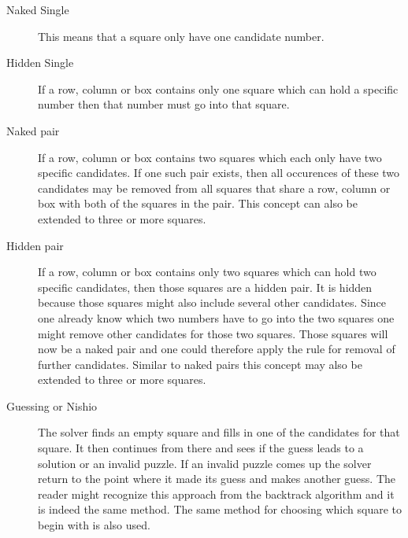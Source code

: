 \documentclass[a4paper,11pt]{kth-mag}
\begin{document}
\begin{description}
    \item[Naked Single] 
    This means that a square only have one candidate number.
    \item[Hidden Single] 
    If a row, column or box contains only one square which can hold a specific number then that number must go into that square.
    \item[Naked pair] 
    If a row, column or box contains two squares which each only have two specific candidates.
If one such pair exists, then all occurences of these two candidates may be removed from all squares that share a row, column or box with both of the squares in the pair.
This concept can also be extended to three or more squares.
    \item[Hidden pair]
    If a row, column or box contains only two squares which can hold two specific candidates, then those squares are a hidden pair.
It is hidden because those squares might also include several other candidates.
Since one already know which two numbers have to go into the two squares one might remove other candidates for those two squares.
Those squares will now be a naked pair and one could therefore apply the rule for removal of further candidates.
Similar to naked pairs this concept may also be extended to three or more squares.

    \item[Guessing or Nishio]
    The solver finds an empty square and fills in one of the candidates for that square.
    It then continues from there and sees if the guess leads to a solution or an invalid puzzle.
    If an invalid puzzle comes up the solver return to the point where it made its guess and makes another guess.
    The reader might recognize this approach from the backtrack algorithm and it is indeed the same method.
    The same method for choosing which square to begin with is also used.
    \end{description}
\end{document}
